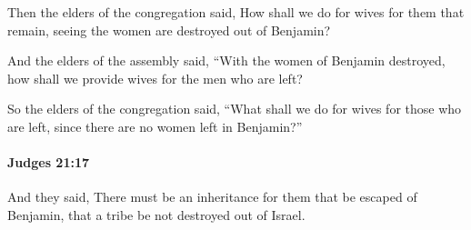 			\begin{versebox}
					\item[BHS] 
					\item[ASV] Then the elders of the congregation said, How shall we do for wives for them that remain, seeing the women are destroyed out of Benjamin?
					\item[NIV] And the elders of the assembly said, “With the women of Benjamin destroyed, how shall we provide wives for the men who are left?
					\item[NRSV] So the elders of the congregation said, “What shall we do for wives for those who are left, since there are no women left in Benjamin?”
			\end{versebox}

		\paragraph{Judges 21:17} %
			\label{JUDGES-21-17}

			And they said, There must be an inheritance for them that be escaped of Benjamin, that a tribe be not destroyed out of Israel.

